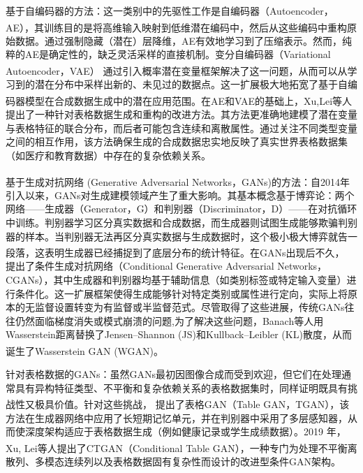基于自编码器的方法：这一类别中的先驱性工作是自编码器（Autoencoder，AE）\textsuperscript{\cite{hinton2006reducing}}，其训练目的是将高维输入映射到低维潜在编码中，然后从这些编码中重构原始数据。通过强制隐藏（潜在）层降维，AE有效地学习到了压缩表示。然而，纯粹的AE是确定性的，缺乏灵活采样的直接机制。变分自编码器（Variational Autoencoder，VAE）\textsuperscript{\cite{kingma2013auto}} 通过引入概率潜在变量框架解决了这一问题，从而可以从学习到的潜在分布中采样出新的、未见过的数据点。这一扩展极大地拓宽了基于自编码器模型在合成数据生成中的潜在应用范围。在AE和VAE的基础上，Xu,Lei等人\textsuperscript{\cite{xu2019modeling}} 提出了一种针对表格数据生成和重构的改进方法。其方法更准确地建模了潜在变量与表格特征的联合分布，而后者可能包含连续和离散属性。通过关注不同类型变量之间的相互作用，该方法确保生成的合成数据忠实地反映了真实世界表格数据集（如医疗和教育数据）中存在的复杂依赖关系。

基于生成对抗网络 (Generative Adversarial Networks，GANs)\textsuperscript{\cite{goodfellow2014generative}}的方法：自2014年引入以来，GANs对生成建模领域产生了重大影响。其基本概念基于博弈论：两个网络——生成器（Generator，G）和判别器（Discriminator，D）——在对抗循环中训练。判别器学习区分真实数据和合成数据，而生成器则试图生成能够欺骗判别器的样本。当判别器无法再区分真实数据与生成数据时，这个极小极大博弈就告一段落，这表明生成器已经捕捉到了底层分布的统计特征。在GANs出现后不久，\textsuperscript{\cite{mirza2014conditional}} 提出了条件生成对抗网络（Conditional Generative Adversarial Networks，CGANs），其中生成器和判别器均基于辅助信息（如类别标签或特定输入变量）进行条件化。这一扩展框架使得生成能够针对特定类别或属性进行定向，实际上将原本的无监督设置转变为有监督或半监督范式。尽管取得了这些进展，传统GANs往往仍然面临梯度消失或模式崩溃的问题,为了解决这些问题，Banach等人用Wasserstein距离替换了Jensen–Shannon (JS)和Kullback–Leibler (KL)散度，从而诞生了Wasserstein GAN (WGAN)\textsuperscript{\cite{adler2018banach,arjovsky2017towards}}。

针对表格数据的GANs：虽然GANs最初因图像合成而受到欢迎，但它们在处理通常具有异构特征类型、不平衡和复杂依赖关系的表格数据集时，同样证明既具有挑战性又极具价值。针对这些挑战，\textsuperscript{\cite{xu2018synthesizing}} 提出了表格GAN（Table GAN，TGAN），该方法在生成器网络中应用了长短期记忆单元，并在判别器中采用了多层感知器，从而使深度架构适应于表格数据生成（例如健康记录或学生成绩数据）。2019 年，Xu, Lei等人\textsuperscript{\cite{xu2019modeling}}提出了CTGAN（Conditional Table GAN），一种专门为处理不平衡离散列、多模态连续列以及表格数据固有复杂性而设计的改进型条件GAN架构。

